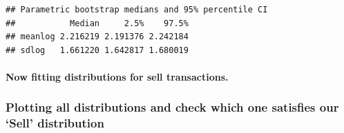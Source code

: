 \documentclass[]{article}
\newenvironment{Shaded}{\begin{snugshade}}{\end{snugshade}}
\newcommand{\KeywordTok}[1]{\textcolor[rgb]{0.13,0.29,0.53}{\textbf{#1}}}
\newcommand{\StringTok}[1]{\textcolor[rgb]{0.31,0.60,0.02}{#1}}
\newcommand{\OperatorTok}[1]{\textcolor[rgb]{0.81,0.36,0.00}{\textbf{#1}}}
\newcommand{\NormalTok}[1]{#1}
\let\oldparagraph\paragraph
\renewcommand{\paragraph}[1]{\oldparagraph{#1}\mbox{}}
\begin{document}
\begin{verbatim}
## Parametric bootstrap medians and 95% percentile CI 
##           Median     2.5%    97.5%
## meanlog 2.216219 2.191376 2.242184
## sdlog   1.661220 1.642817 1.680019
\end{verbatim}

\paragraph{Now fitting distributions for sell
transactions.}\label{now-fitting-distributions-for-sell-transactions.}

\begin{Shaded}
\end{Shaded}

\subsubsection{\texorpdfstring{Plotting all distributions and check
which one satisfies our `Sell'
distribution}{Plotting all distributions and check which one satisfies our Sell distribution}}\label{plotting-all-distributions-and-check-which-one-satisfies-our-sell-distribution-1}
\end{document}
